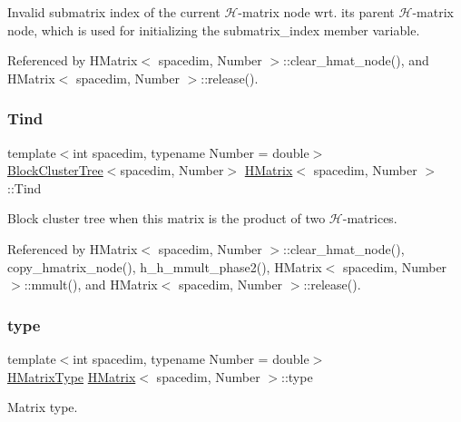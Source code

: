 Invalid submatrix index of the current $\mathcal{H}$-\/matrix node wrt. its parent $\mathcal{H}$-\/matrix node, which is used for initializing the {\ttfamily submatrix\+\_\+index} member variable. 

Referenced by H\+Matrix$<$ spacedim, Number $>$\+::clear\+\_\+hmat\+\_\+node(), and H\+Matrix$<$ spacedim, Number $>$\+::release().

\mbox{\label{classHMatrix_a12da9454687e5ca15837d63e2bf0b595}} 
\subsubsection{\texorpdfstring{Tind}{Tind}}
{\footnotesize\ttfamily template$<$int spacedim, typename Number = double$>$ \\
\hyperlink{classBlockClusterTree}{Block\+Cluster\+Tree}$<$spacedim, Number$>$ \hyperlink{classHMatrix}{H\+Matrix}$<$ spacedim, Number $>$\+::Tind\hspace{0.3cm}{\ttfamily [private]}}

Block cluster tree when this matrix is the product of two $\mathcal{H}$-\/matrices. 

Referenced by H\+Matrix$<$ spacedim, Number $>$\+::clear\+\_\+hmat\+\_\+node(), copy\+\_\+hmatrix\+\_\+node(), h\+\_\+h\+\_\+mmult\+\_\+phase2(), H\+Matrix$<$ spacedim, Number $>$\+::mmult(), and H\+Matrix$<$ spacedim, Number $>$\+::release().

\mbox{\label{classHMatrix_a89ef60f3ba737c04708195ca0bb13620}} 
\subsubsection{\texorpdfstring{type}{type}}
{\footnotesize\ttfamily template$<$int spacedim, typename Number = double$>$ \\
\hyperlink{hmatrix_8h_ac04719e202c88f36e4533fe1d326a494}{H\+Matrix\+Type} \hyperlink{classHMatrix}{H\+Matrix}$<$ spacedim, Number $>$\+::type\hspace{0.3cm}{\ttfamily [private]}}

Matrix type. 


